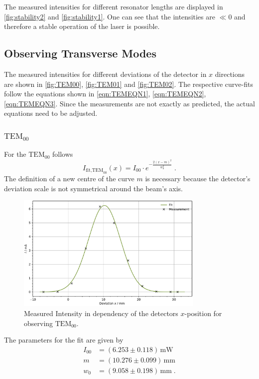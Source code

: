 The measured intensities for different resonator lengths are displayed in \autoref{fig:stability2} and \autoref{fig:stability1}. One can see that the intensities are $\ll 0$ and therefore a stable operation of the laser is possible.

\subsection{Observing Transverse Modes}

The measured intensities for different deviations of the detector in $x$ directions are shown in \autoref{fig:TEM00}, \autoref{fig:TEM01} and \autoref{fig:TEM02}. The respective curve-fits follow the equations shown in \eqref{eqn:TEMEQN1}, \eqref{eqn:TEMEQN2}, \eqref{eqn:TEMEQN3}. Since the measurements are not exactly as 
predicted, the actual equations need to be adjusted.

\subsubsection{$\text{TEM}_{00}$}

For the $\text{TEM}_{00}$ follows 
\begin{equation*}
    I_{\text{fit,TEM}_{00}}(x) = I_{00} \cdot e^{-\frac{2 (x - m)^2}{w_0^2}}\; .
\end{equation*}
The definition of a new centre of the curve $m$ is necessary because the detector's deviation scale is not symmetrical around the beam's axis.
\begin{figure}
	\centering
	\includegraphics[width=0.8\textwidth]{content/plots/TEM00.pdf}
	\caption{Measured Intensity in dependency of the detectors $x$-position for observing $\text{TEM}_{00}$.}
	\label{fig:TEM00}
\end{figure}
The parameters for the fit are given by
\begin{align*}
    I_{00} &= (6.253\pm 0.118) \, \unit{\milli \watt}\\
    m &= (10.276\pm 0.099)\, \unit{\milli \meter}\\
    w_0 &= (9.058\pm 0.198) \, \unit{\milli \meter}\; .
\end{align*}


